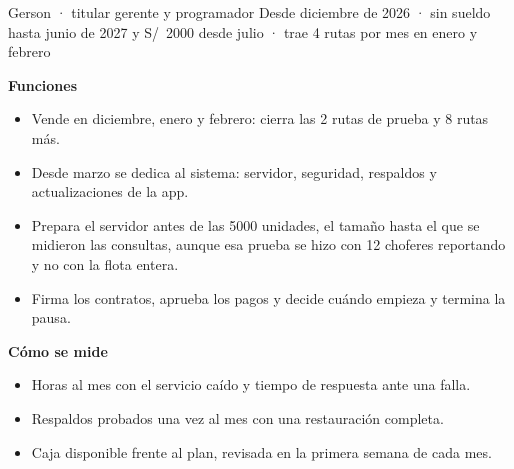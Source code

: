 \documentclass[10.5pt,a4paper]{article}
\begin{document}
\begin{rol}{Gerson · titular gerente y programador}
{\small\color{tenue}Desde diciembre de 2026 · sin sueldo hasta junio de 2027 y S/~2000 desde julio · trae 4 rutas por mes en enero y febrero}\par\vspace{3pt}
\begin{minipage}[t]{0.52\linewidth}\small\textbf{\color{marca}Funciones}
\begin{itemize}
\item Vende en diciembre, enero y febrero: cierra las 2 rutas de prueba y 8 rutas más.
\item Desde marzo se dedica al sistema: servidor, seguridad, respaldos y actualizaciones de la app.
\item Prepara el servidor antes de las 5000 unidades, el tamaño hasta el que se midieron las consultas, aunque esa prueba se hizo con 12 choferes reportando y no con la flota entera.
\item Firma los contratos, aprueba los pagos y decide cuándo empieza y termina la pausa.
\end{itemize}\end{minipage}\hfill
\begin{minipage}[t]{0.44\linewidth}\small\textbf{\color{marca}Cómo se mide}
\begin{itemize}
\item Horas al mes con el servicio caído y tiempo de respuesta ante una falla.
\item Respaldos probados una vez al mes con una restauración completa.
\item Caja disponible frente al plan, revisada en la primera semana de cada mes.
\end{itemize}\end{minipage}
\end{rol}
\end{document}

